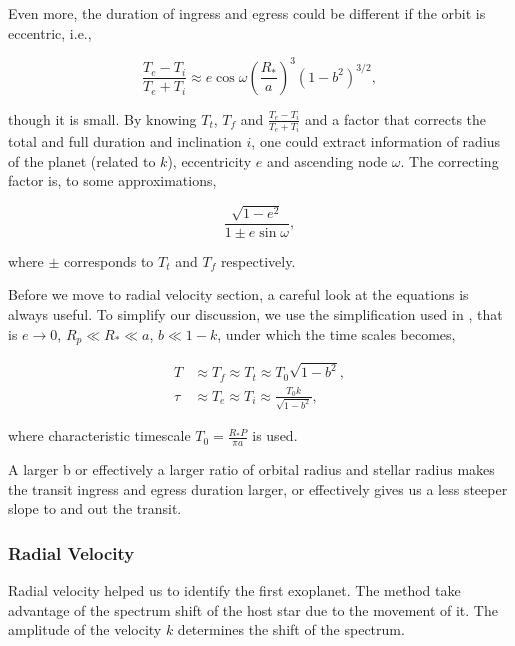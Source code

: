 \documentclass[12pt]{article}
\begin{document}
Even more, the duration of ingress and egress could be different if the orbit is eccentric, i.e.,

\begin{equation}
\frac{T_e - T_i}{T_e + T_i} \approx e \cos \omega \left( \frac{R_*}{a} \right)^3 (1-b^2)^{3/2} ,
\end{equation}

though it is small. By knowing $T_t$, $T_f$ and $\frac{T_e - T_i}{T_e + T_i}$ and a factor that corrects the total and full duration and inclination $i$, one could extract information of radius of the planet (related to $k$), eccentricity $e$ and ascending node $\omega$. The correcting factor is, to some approximations, 

\begin{equation}
\frac{\sqrt{1 - e^2}}{1 \pm e \sin \omega},
\end{equation}

where $\pm$ corresponds to $T_t$ and $T_f$ respectively.


Before we move to radial velocity section, a careful look at the equations is always useful. To simplify our discussion, we use the simplification used in \cite{2010arXiv1001.2010W}, that is $e\to 0$, $R_p \ll R_* \ll a$, $b \ll 1-k$, under which the time scales becomes,

\begin{align}
T &\approx T_f \approx T_t \approx T_0 \sqrt{1 - b^2}, \\
\tau & \approx T_e \approx T_i \approx \frac{T_0 k}{\sqrt{1-b^2}},
\end{align}

where characteristic timescale $T_0 = \frac{R_* P}{\pi a}$ is used.

A larger b or effectively a larger ratio of orbital radius and stellar radius makes the transit ingress and egress duration larger, or effectively gives us a less steeper slope to and out the transit.





\subsubsection*{Radial Velocity}

Radial velocity helped us to identify the first exoplanet. The method take advantage of the spectrum shift of the host star due to the movement of it. The amplitude of the velocity $k$ determines the shift of the spectrum.
\end{document}

